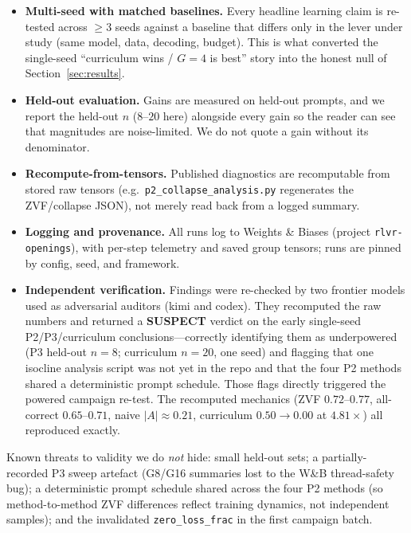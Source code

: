 \documentclass[11pt,a4paper]{article}
\begin{document}
\begin{itemize}[leftmargin=1.4em,itemsep=2pt]
  \item \textbf{Multi-seed with matched baselines.} Every headline learning claim
  is re-tested across $\ge 3$ seeds against a baseline that differs only in the
  lever under study (same model, data, decoding, budget). This is what converted
  the single-seed ``curriculum wins / $G{=}4$ is best'' story into the honest
  null of Section~\ref{sec:results}.
  \item \textbf{Held-out evaluation.} Gains are measured on held-out prompts, and
  we report the held-out $n$ ($8$--$20$ here) alongside every gain so the reader
  can see that magnitudes are noise-limited. We do not quote a gain without its
  denominator.
  \item \textbf{Recompute-from-tensors.} Published diagnostics are recomputable
  from stored raw tensors (e.g.\ \texttt{p2\_collapse\_analysis.py} regenerates
  the ZVF/collapse JSON), not merely read back from a logged summary.
  \item \textbf{Logging and provenance.} All runs log to Weights \& Biases
  (project \texttt{rlvr-openings}), with per-step telemetry and saved group
  tensors; runs are pinned by config, seed, and framework.
  \item \textbf{Independent verification.} Findings were re-checked by two
  frontier models used as adversarial auditors (kimi and codex). They recomputed
  the raw numbers and returned a \textbf{SUSPECT} verdict on the early
  single-seed P2/P3/curriculum conclusions---correctly identifying them as
  underpowered (P3 held-out $n=8$; curriculum $n=20$, one seed) and flagging that
  one isocline analysis script was not yet in the repo and that the four P2
  methods shared a deterministic prompt schedule. Those flags directly triggered
  the powered campaign re-test. The recomputed mechanics
  (ZVF $0.72$--$0.77$, all-correct $0.65$--$0.71$, naive $|A|\approx0.21$,
  curriculum $0.50\to0.00$ at $4.81\times$) all reproduced exactly.
\end{itemize}

Known threats to validity we do \emph{not} hide: small held-out sets; a
partially-recorded P3 sweep artefact (G8/G16 summaries lost to the W\&B
thread-safety bug); a deterministic prompt schedule shared across the four P2
methods (so method-to-method ZVF differences reflect training dynamics, not
independent samples); and the invalidated \texttt{zero\_loss\_frac} in the first
campaign batch.
\end{document}
